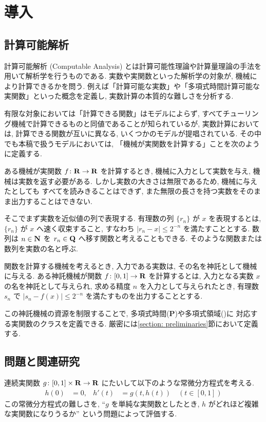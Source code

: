 \section{導入}

\subsection{計算可能解析}

計算可能解析 (Computable Analysis) とは計算可能性理論や計算量理論の手法を用いて解析学を行うものである. 
実数や実関数といった解析学の対象が, 機械により計算できるかを問う. 
例えば「計算可能な実数」や「多項式時間計算可能な実関数」といった概念を定義し, 
実数計算の本質的な難しさを分析する.

有限な対象においては「計算できる関数」はモデルによらず,
すべてチューリング機械で計算できるものと同値であることが知られているが,
実数計算においては, 計算できる関数が互いに異なる, いくつかのモデルが提唱されている.
その中でも本稿で扱うモデルにおいては,
「機械が実関数を計算する」ことを次のように定義する.

ある機械が実関数 $f \colon \mathbf R \to \mathbf R$ を計算するとき,
機械に入力として実数を与え, 機械は実数を返す必要がある.
しかし実数の大きさは無限であるため, 機械に与えたとしても
すべてを読みきることはできず,
また無限の長さを持つ実数をそのまま出力することはできない.

そこでまず実数を近似値の列で表現する.
有理数の列 $\{r_n\}$ が $x$ を表現するとは,
$\{r_n\}$ が $x$ へ速く収束すること, 
すなわち $|r_n - x| \le 2^{-n}$ を満たすこととする.
数列は $n \in \mathbf N$ を $r_n \in \mathbf Q$ へ移す関数と考えることもできる.
そのような関数または数列を実数の名と呼ぶ.

関数を計算する機械を考えるとき,
入力である実数は, その名を神託として機械に与える.
ある神託機械が関数 $f \colon [0, 1] \to \mathbf R$ を計算するとは,
入力となる実数 $x$ の名を神託として与えられ,
求める精度 $n$ を入力として与えられたとき,
有理数 $s_n$ で $|s_n - f(x)| \le 2^{-n}$ を満たすものを出力することとする.

この神託機械の資源を制限することで, 多項式時間({\bf P})や多項式領域(\PSPACE)に
対応する実関数のクラスを定義できる.
厳密には\ref{section: preliminaries}節において定義する.

\subsection{問題と関連研究}

連続実関数 $g \colon [0,1] \times \mathbf R \to \mathbf R$ にたいして以下のような常微分方程式を考える. 
\begin{align}
 \label{eq:ode}
 h(0) & = 0, &
 h'(t) & = g(t,h(t)) \quad (t \in [0,1])
\end{align}
この常微分方程式の難しさを, ``$g$ を単純な実関数としたとき, 
$h$ がどれほど複雑な実関数になりうるか'' という問題によって評価する.

